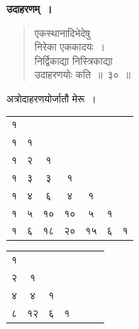 \documentclass[11pt, openany]{book}
\begin{document}
\textbf{उदाहरणम्~।}
\begin{quote}
{\ex एकस्थानादिभेदेषु\\
निरेका एककादयः~।\\
निर्द्विकाद्या निस्त्रिकाद्या\\
उदाहरणयोः कति~॥~३०~॥	}
\end{quote}

अत्रोदाहरणयोर्जातौ मेरू~।\\

\hspace{6mm} \begin{tabular}{|c|c|c|c|c|c|c|}
\cline{1-1}
{\hbox{१}} & \multicolumn{1}{c}{}& \multicolumn{1}{c}{}& \multicolumn{1}{c}{}& \multicolumn{1}{c}{}& \multicolumn{1}{c}{} &  \multicolumn{1}{c}{} \\ \cline{1-1}
\cline{2-1}
{\hbox{१}} & {\hbox{१}}& \multicolumn{1}{c}{}& \multicolumn{1}{c}{}& \multicolumn{1}{c}{}& \multicolumn{1}{c}{} &  \multicolumn{1}{c}{} \\ \cline{1-2}
\cline{3-1}
{\hbox{१}} & {\hbox{२}}& {\hbox{१}}& \multicolumn{1}{c}{}& \multicolumn{1}{c}{}& \multicolumn{1}{c}{} &  \multicolumn{1}{c}{} \\ \cline{1-3}
\cline{4-1}
{\hbox{१}} & {\hbox{३}}& {\hbox{३}}& {\hbox{१}} & \multicolumn{1}{c}{}& \multicolumn{1}{c}{} &  \multicolumn{1}{c}{} \\ \cline{1-4}
\cline{5-1}
{\hbox{१}} & {\hbox{४}}& {\hbox{६}}& {\hbox{४}} & {\hbox{१}} & \multicolumn{1}{c}{} &  \multicolumn{1}{c}{} \\ \cline{1-5}
\cline{6-1}
{\hbox{१}} & {\hbox{५}}& {\hbox{१०}}& {\hbox{१०}} & {\hbox{५}} & {\hbox{१}}  &  \multicolumn{1}{c}{} \\ \cline{1-6}
\cline{7-1}
{\hbox{१}} & {\hbox{६}}& {\hbox{१८}}& {\hbox{२०}} & {\hbox{१५}} & {\hbox{६}}  & {\hbox{१}}  \\ \cline{1-7}
\end{tabular}\qquad\qquad
\begin{tabular}{|c|c|c|c|c|c|c|}
	\cline{1-1}
	{\hbox{१}} & \multicolumn{1}{c}{}& \multicolumn{1}{c}{}& \multicolumn{1}{c}{}& \multicolumn{1}{c}{}& \multicolumn{1}{c}{} &  \multicolumn{1}{c}{} \\ \cline{1-1}
	\cline{2-1}
	{\hbox{२}} & {\hbox{१}}& \multicolumn{1}{c}{}& \multicolumn{1}{c}{}& \multicolumn{1}{c}{}& \multicolumn{1}{c}{} &  \multicolumn{1}{c}{} \\ \cline{1-2}
	\cline{3-1}
	{\hbox{४}} & {\hbox{४}}& {\hbox{१}}& \multicolumn{1}{c}{}& \multicolumn{1}{c}{}& \multicolumn{1}{c}{} &  \multicolumn{1}{c}{} \\ \cline{1-3}
	\cline{4-1}
	{\hbox{८}} & {\hbox{१२}}& {\hbox{६}}& {\hbox{१}} & \multicolumn{1}{c}{}& \multicolumn{1}{c}{} &  \multicolumn{1}{c}{} \\ \cline{1-4}
\end{tabular}\\
\vspace{4mm}
\end{document}
